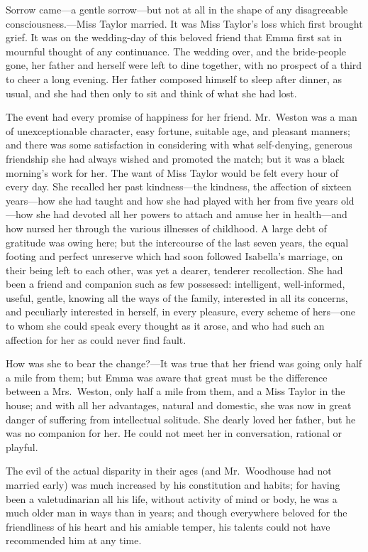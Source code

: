 Sorrow came---a gentle sorrow---but not at all in the shape of any
disagreeable consciousness.---Miss Taylor married.  It was Miss
Taylor's loss which first brought grief.  It was on the wedding-day
of this beloved friend that Emma first sat in mournful thought
of any continuance.  The wedding over, and the bride-people gone,
her father and herself were left to dine together, with no prospect
of a third to cheer a long evening.  Her father composed himself
to sleep after dinner, as usual, and she had then only to sit
and think of what she had lost.

The event had every promise of happiness for her friend.  Mr.\ Weston
was a man of unexceptionable character, easy fortune, suitable age,
and pleasant manners; and there was some satisfaction in considering
with what self-denying, generous friendship she had always wished
and promoted the match; but it was a black morning's work for her.
The want of Miss Taylor would be felt every hour of every day.
She recalled her past kindness---the kindness, the affection of sixteen
years---how she had taught and how she had played with her from five
years old---how she had devoted all her powers to attach and amuse
her in health---and how nursed her through the various illnesses
of childhood.  A large debt of gratitude was owing here; but the
intercourse of the last seven years, the equal footing and perfect
unreserve which had soon followed Isabella's marriage, on their
being left to each other, was yet a dearer, tenderer recollection.
She had been a friend and companion such as few possessed: intelligent,
well-informed, useful, gentle, knowing all the ways of the family,
interested in all its concerns, and peculiarly interested in herself,
in every pleasure, every scheme of hers---one to whom she could speak
every thought as it arose, and who had such an affection for her
as could never find fault.

How was she to bear the change?---It was true that her friend was
going only half a mile from them; but Emma was aware that great must
be the difference between a Mrs.\ Weston, only half a mile from them,
and a Miss Taylor in the house; and with all her advantages,
natural and domestic, she was now in great danger of suffering
from intellectual solitude.  She dearly loved her father, but he
was no companion for her.  He could not meet her in conversation,
rational or playful.

The evil of the actual disparity in their ages (and Mr.\ Woodhouse had
not married early) was much increased by his constitution and habits;
for having been a valetudinarian all his life, without activity
of mind or body, he was a much older man in ways than in years;
and though everywhere beloved for the friendliness of his heart
and his amiable temper, his talents could not have recommended him
at any time.

